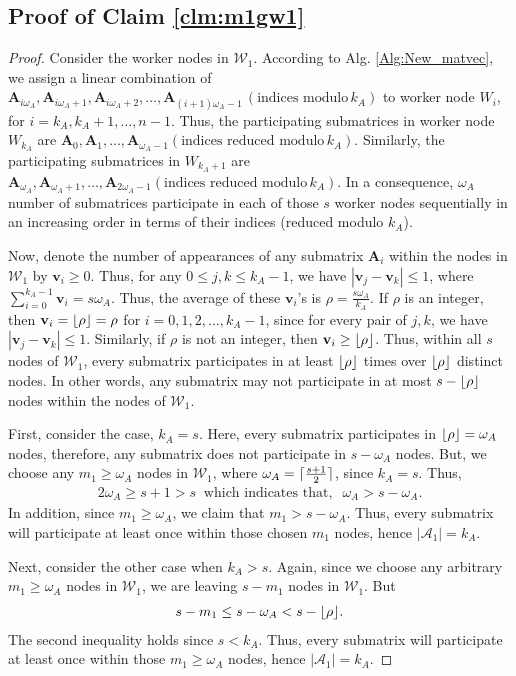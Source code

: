 \documentclass[conference]{IEEEtran}
\DeclarePairedDelimiter{\ceil}{\lceil}{\rceil}
\DeclarePairedDelimiter{\floor}{\lfloor}{\rfloor}
\theoremstyle{definition}
\newcommand{\calA}{\mathcal{A}}
\newcommand{\calW}{\mathcal{W}}
\newcommand{\bfA}{\mathbf{A}}
\newcommand{\bfv}{\mathbf{v}}
\begin{document}
\subsection{Proof of Claim \ref{clm:m1gw1}}
\label{app:proofclaim1}
\begin{proof}
Consider the worker nodes in $\calW_1$. According to Alg. \ref{Alg:New_matvec}, we assign a linear combination of $\bfA_{i\omega_A}, \bfA_{i\omega_A + 1}, \bfA_{i\omega_A + 2}, \dots, \bfA_{(i+1)\omega_A - 1} \, \left(\textrm{indices modulo} \, k_A \right)$ to worker node $W_{i}$, for $i = k_A, k_A + 1, \dots, n-1$. Thus, the participating submatrices in worker node $W_{k_A}$ are $\bfA_0, \bfA_1, \dots, \bfA_{\omega_A - 1} \left(\textrm{indices reduced modulo} \, k_A \right)$. Similarly, the participating submatrices in $W_{k_A + 1}$ are $\bfA_{\omega_A}, \bfA_{\omega_A+1}, \dots, \bfA_{2\omega_A - 1} \left(\textrm{indices reduced modulo} \, k_A \right)$. In a consequence, $\omega_A$ number of submatrices participate in each of those $s$ worker nodes sequentially in an increasing order in terms of their indices (reduced modulo $k_A$). 

Now, denote the number of appearances of any submatrix $\bfA_i$ within the nodes in $\calW_1$ by $\bfv_i \geq 0$. Thus, for any $0 \leq j, k \leq k_A - 1$, we have $ |\bfv_j  -  \bfv_k| \leq 1$, where $\sum_{i = 0}^{k_A - 1} \bfv_i = s \omega_A$. Thus, the average of these $\bfv_i$'s is $\rho = \frac{s \omega_A}{k_A}$. If $\rho$ is an integer, then $\bfv_i = \floor{\rho} = \rho$ for $i = 0, 1, 2, \dots, k_A - 1$, since for every pair of $j,k$, we have $|\bfv_j  -  \bfv_k| \leq 1$. Similarly, if $\rho$ is not an integer, then $\bfv_i \geq \floor{\rho}$. Thus, within all $s$ nodes of $\calW_1$, every submatrix participates in at least $\floor{\rho}$ times over $\floor{\rho}$ distinct nodes. In other words, any submatrix may not participate in at most $s - \floor{\rho}$ nodes within the nodes of $\calW_1$.

First, consider the case, $k_A = s$. Here, every submatrix participates in $\floor{\rho} = \omega_A$ nodes, therefore, any submatrix does not participate in $s - \omega_A$ nodes. But, we choose any $m_1 \geq \omega_A$ nodes in $\calW_1$, where $\omega_A = \ceil{\frac{s+1}{2}}$, since $k_A = s$. Thus,
\begin{align*}
   2 \omega_A \geq s + 1 > s \;\; \textrm{which indicates that}, \;\; \omega_A > s - \omega_A.
\end{align*}In addition, since $m_1 \geq \omega_A$, we claim that $m_1 > s - \omega_A$. Thus, every submatrix will participate at least once within those chosen $m_1$ nodes, hence $|\calA_1| = k_A$. 

Next, consider the other case when  $k_A > s$. Again, since we choose any arbitrary $m_1 \geq \omega_A$ nodes in $\calW_1$, we are leaving $s - m_1$ nodes in $\calW_1$. But 
\begin{align*}
    s - m_1 \leq s - \omega_A < s - \floor{\rho}.
\end{align*} The second inequality holds since $s < k_A$. Thus, every submatrix will participate at least once within those $m_1 \geq \omega_A$ nodes, hence $|\calA_1| = k_A$.
\end{proof}
\end{document}
